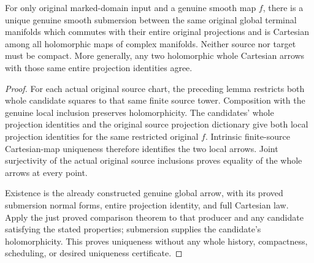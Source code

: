 \begin{theorem}
\label{hir:original-arbitrary-target-global-intrinsic-smooth-cartesian-uniqueness}
\leanok
{}
For only original marked-domain input and a genuine smooth map $f$, there
is a unique genuine smooth submersion between the same original global
terminal manifolds which commutes with their entire original projections
and is Cartesian among all holomorphic maps of complex manifolds. Neither
source nor target must be compact. More generally, any two holomorphic
whole Cartesian arrows with those same entire projection identities agree.
\end{theorem}
\begin{proof}
For each actual original source chart, the preceding lemma restricts both
whole candidate squares to that same finite source tower. Composition with
the genuine local inclusion preserves holomorphicity. The candidates'
whole projection identities and the original source projection dictionary
give both local projection identities for the same restricted original
$f$. Intrinsic finite-source Cartesian-map uniqueness therefore identifies
the two local arrows. Joint surjectivity of the actual original source
inclusions proves equality of the whole arrows at every point.

Existence is the already constructed genuine global arrow, with its proved
submersion normal forms, entire projection identity, and full Cartesian
law. Apply the just proved comparison theorem to that producer and any
candidate satisfying the stated properties; submersion supplies the
candidate's holomorphicity. This proves uniqueness without any whole
history, compactness, scheduling, or desired uniqueness certificate.
\end{proof}
